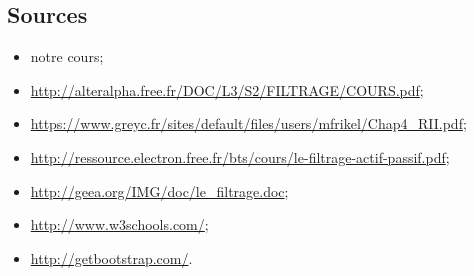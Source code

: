 \documentclass[a4paper,11pt]{article}
\begin{document}
    \clearpage

    \subsection*{Sources}
        \begin{itemize}
            \item notre cours;
            \item \url{http://alteralpha.free.fr/DOC/L3/S2/FILTRAGE/COURS.pdf};
            \item \url{https://www.greyc.fr/sites/default/files/users/mfrikel/Chap4_RII.pdf};
            \item \url{http://ressource.electron.free.fr/bts/cours/le-filtrage-actif-passif.pdf};
            \item \url{http://geea.org/IMG/doc/le_filtrage.doc};
            \item \url{http://www.w3schools.com/};
            \item \url{http://getbootstrap.com/}.
        \end{itemize}


    \clearpage
\end{document}
